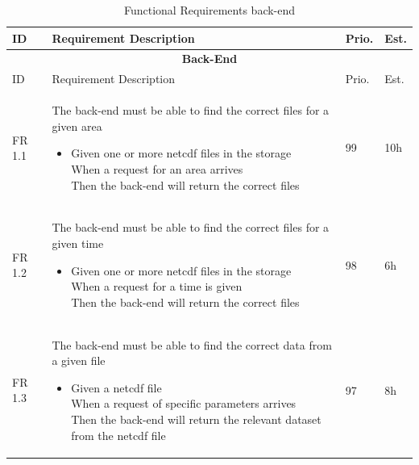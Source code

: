 \documentclass[11pt,a4paper,titlepage,oneside]{report}
\begin{document}
  \begin{longtable}{p{1.4cm} p{7.8cm} p{1cm} p{1cm} }
  \caption[]{Functional Requirements \gls{back-end}}\\
  \multicolumn{1}{p{1.4cm}}{ID} &
  \multicolumn{1}{p{7.8cm}}{Requirement Description} &
  \multicolumn{1}{p{1cm}}{Prio.} &
  \multicolumn{1}{p{1cm}}{Est.}
  \endhead

  \caption[Functional Requirements \gls{back-end}]{} \label{funcReqsBack} \\
  \hline \multicolumn{4}{c}{\textbf{Back-End}} \\
  \hline
  \multicolumn{1}{p{1.4cm}}{ID} &
  \multicolumn{1}{p{7.8cm}}{Requirement Description} &
  \multicolumn{1}{p{1cm}}{Prio.} &
  \multicolumn{1}{p{1cm}}{Est.}
  \endfirsthead
  
  \hline
  \multicolumn{4}{r}{{Continued on next page}} \\
  \endfoot

  \hline \hline
  \endlastfoot

  \hline  
  FR 1.1 & The \gls{back-end} must be able to find the correct files for a given area
  
  \begin{itemize}
  \item \parbox[t]{6.8cm}{
        Given one or more \gls{netcdf} files in the storage \\ 
        When a request for an area arrives \\ 
        Then the \gls{back-end} will return the correct files}
  \end{itemize}
   & 99 & 10h \\ \hline
  
  FR 1.2 & The \gls{back-end} must be able to find the correct files for a given time 
  \begin{itemize}
  \item \parbox[t]{6.8cm}{
        Given one or more \gls{netcdf} files in the storage \\ 
        When a request for a time is given \\ 
        Then the \gls{back-end} will return the correct files}
  \end{itemize}
  & 98 & 6h \\ \hline %

  FR 1.3 & The \gls{back-end} must be able to find the correct data from a given file 
  \begin{itemize}
  \item \parbox[t]{6.8cm}{
        Given a \gls{netcdf} file \\ 
        When a request of specific parameters arrives \\ 
        Then the \gls{back-end} will return the relevant dataset from the \gls{netcdf} file}
  \end{itemize}
  & 97 & 8h \\ \hline


\end{longtable}
\end{document}
